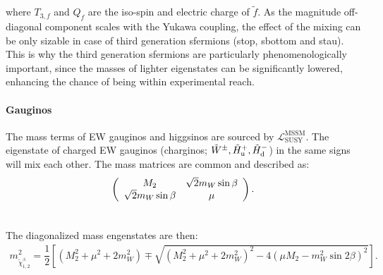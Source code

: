 where $T_{3,f}$ and $Q_f$ are the iso-spin and electric charge of $\tilde{f}$. As the magnitude off-diagonal component scales with the Yukawa coupling, the effect of the mixing can be only sizable in case of third generation sfermions (stop, sbottom and stau).
This is why the third generation sfermions are particularly phenomenologically important,   
since the masses of lighter eigenstates can be significantly lowered, enhancing the chance of being within experimental reach.  \\



\paragraph{Gauginos}
The mass terms of EW gauginos and higgsinos are sourced by $\mathcal{L}^{\mathrm{MSSM}}_{\mathrm{SUSY}}$. The eigenstate of charged EW gauginos (charginos; $\tilde{W}^\pm, \tilde{H}^+_{\mathrm{u}}, \tilde{H}^-_{\mathrm{d}}$) in the same signs will mix each other.
The mass matrices are common and described as:
\begin{align}
\left(  
  \begin{array}{cc}
    M_2                    &  \sqrt{2} m_W \sin{\beta} \\
    \sqrt{2} m_W \sin{\beta} &  \mu                    \\
  \end{array}
\right). \nonumber \\ \nonumber
\end{align}

The diagonalized mass engenstates are then:
\begin{align}
m_{\tilde{\chi}_{1,2}^{\pm}}^2 = \dfrac{1}{2} \left[ (M_2^2+\mu^2+2m_W^2) \mp \sqrt{(M_2^2+\mu^2+2m_W^2)^2 - 4(\mu M_2-m_W^2\sin2\beta)^2} \right].
\end{align}

